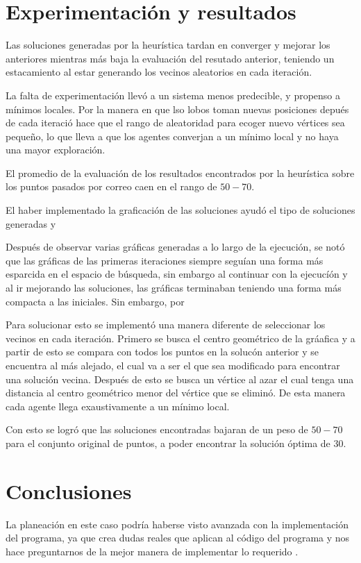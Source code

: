 \documentclass[a4paper]{article}
\begin{document}
\section*{Experimentaci\'on y resultados}

Las soluciones generadas por la heur\'istica tardan en converger y mejorar los anteriores mientras
m\'as baja la evaluaci\'on del resutado anterior, teniendo un estacamiento al estar generando los
vecinos aleatorios en cada iteraci\'on.



La falta de experimentaci\'on llev\'o a un sistema menos predecible, y propenso a m\'inimos locales.
Por la manera en que lso lobos toman nuevas posiciones depu\'es de cada iteraci\'o hace que el rango de aleatoridad para ecoger nuevo v\'ertices sea pequeño, lo que lleva a que los agentes converjan a
un m\'inimo local y no haya una mayor exploraci\'on.

El promedio de la evaluaci\'on de los resultados encontrados por la heur\'istica sobre los puntos pasados por correo caen en el rango de $50 - 70$. 

El haber implementado la graficaci\'on de las soluciones ayud\'o el tipo de soluciones generadas y 


 Despu\'es de observar varias gr\'aficas generadas a lo largo de la ejecuci\'on, se not\'o que las gr\'aficas de las primeras iteraciones siempre segu\'ian una forma m\'as esparcida
en el espacio de b\'usqueda, sin embargo al continuar con la ejecuc\'i\'on y al ir mejorando las
soluciones, las gr\'aficas terminaban teniendo una forma m\'as compacta a las iniciales. Sin embargo, por


Para solucionar esto se implement\'o una manera diferente de seleccionar los vecinos en cada iteraci\'on. Primero se busca el centro geom\'etrico de la gr\'aafica y a partir de esto se compara con
todos los puntos en la soluc\'on anterior y se encuentra al m\'as alejado, el cual va a ser el que
sea modificado para encontrar una soluci\'on vecina. Despu\'es de esto se busca un v\'ertice al azar
el cual tenga una distancia al centro geom\'etrico menor del v\'ertice que se elimin\'o. De esta
manera cada agente llega exaustivamente a un m\'inimo local.

Con esto se logr\'o que las soluciones encontradas bajaran de un peso de $50-70$ para el conjunto
original de puntos, a poder encontrar la soluci\'on \'optima de 30.

\section*{Conclusiones}
La planeaci\'on en este caso podr\'ia haberse visto avanzada con la implementaci\'on del programa,
ya que crea dudas reales que aplican al c\'odigo del programa y nos hace preguntarnos de la mejor
manera de implementar lo requerido .
\end{document}
